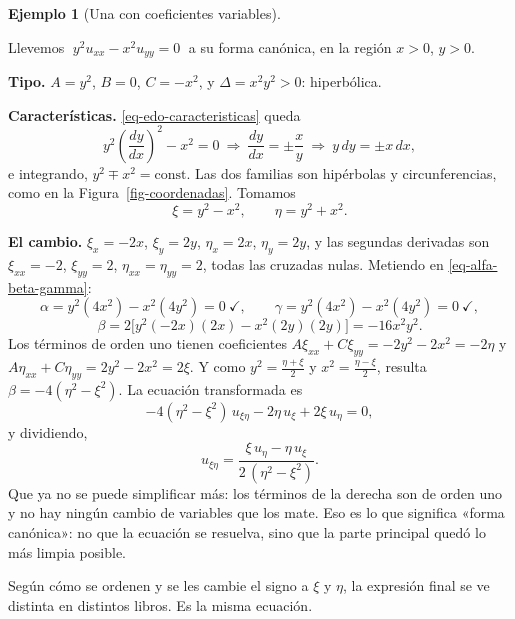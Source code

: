 \documentclass[
  spanish,
  a4paper,
]{scrbook}
\theoremstyle{definition}
\theoremstyle{plain}
\theoremstyle{definition}
\newtheorem{example}{Ejemplo}[chapter]
\theoremstyle{plain}
\theoremstyle{definition}
\theoremstyle{remark}
\begin{document}
\begin{example}[Una con coeficientes
variables]\protect\hypertarget{exm-canonica-variable}{}\label{exm-canonica-variable}

Llevemos \(\;y^2u_{xx} - x^2u_{yy} = 0\;\) a su forma canónica, en la
región \(x>0\), \(y>0\).

\textbf{Tipo.} \(A=y^2\), \(B=0\), \(C=-x^2\), y
\(\Delta = x^2y^2 > 0\): hiperbólica.

\textbf{Características.} \ref{eq-edo-caracteristicas} queda
\[y^2\left(\frac{dy}{dx}\right)^2 - x^2 = 0 \ \Longrightarrow\ \frac{dy}{dx} = \pm\frac{x}{y}
\ \Longrightarrow\ y\,dy = \pm x\,dx ,\] e integrando,
\(y^2 \mp x^2 = \text{const}\). Las dos familias son hipérbolas y
circunferencias, como en la Figura~\ref{fig-coordenadas}. Tomamos
\[\xi = y^2 - x^2, \qquad \eta = y^2 + x^2 .\]

\textbf{El cambio.} \(\xi_x = -2x\), \(\xi_y = 2y\), \(\eta_x = 2x\),
\(\eta_y = 2y\), y las segundas derivadas son \(\xi_{xx}=-2\),
\(\xi_{yy}=2\), \(\eta_{xx}=\eta_{yy}=2\), todas las cruzadas nulas.
Metiendo en \ref{eq-alfa-beta-gamma}: \[
\alpha = y^2(4x^2) - x^2(4y^2) = 0 \ \checkmark, \qquad
\gamma = y^2(4x^2) - x^2(4y^2) = 0 \ \checkmark,
\] \[
\beta = 2\big[y^2(-2x)(2x) - x^2(2y)(2y)\big] = -16x^2y^2 .
\] Los términos de orden uno tienen coeficientes
\(A\xi_{xx} + C\xi_{yy} = -2y^2-2x^2 = -2\eta\) y
\(A\eta_{xx}+C\eta_{yy} = 2y^2-2x^2 = 2\xi\). Y como
\(y^2 = \tfrac{\eta+\xi}{2}\) y \(x^2 = \tfrac{\eta-\xi}{2}\), resulta
\(\beta = -4(\eta^2-\xi^2)\). La ecuación transformada es \[
-4(\eta^2-\xi^2)\,u_{\xi\eta} - 2\eta\,u_\xi + 2\xi\,u_\eta = 0 ,
\] y dividiendo, \[
u_{\xi\eta} = \frac{\xi\,u_\eta - \eta\,u_\xi}{2\,(\eta^2-\xi^2)} .
\] Que ya no se puede simplificar más: los términos de la derecha son de
orden uno y no hay ningún cambio de variables que los mate. Eso es lo
que significa «forma canónica»: no que la ecuación se resuelva, sino que
la parte principal quedó lo más limpia posible.

Según cómo se ordenen y se les cambie el signo a \(\xi\) y \(\eta\), la
expresión final se ve distinta en distintos libros. Es la misma
ecuación.

\end{example}
\end{document}
